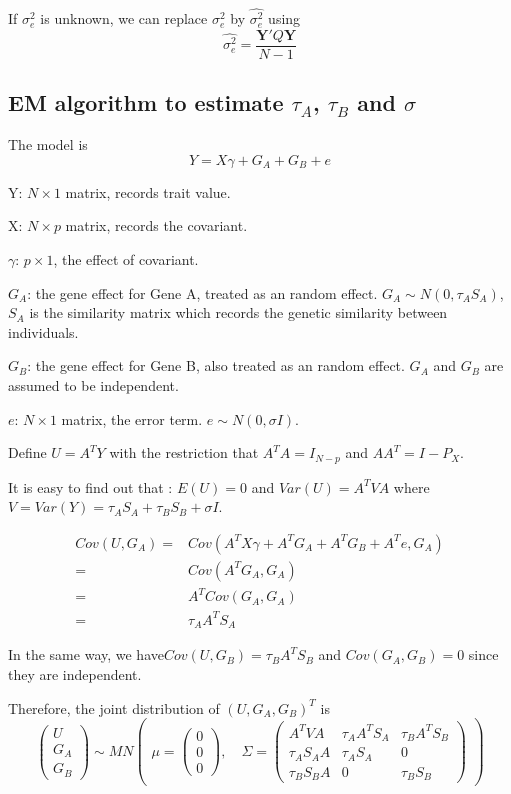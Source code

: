\documentclass{article}
\newcommand{\Y}{\mathbf{Y}}
\begin{document}
            If $\sigma^2_e$ is unknown, we can replace $\sigma^2_e$ by $\hat{\sigma^2_e}$ using
            \[
                \hat{\sigma^2_e}=\frac{\Y'Q\Y}{N-1}
            \]

        \subsection{EM algorithm to estimate $\tau_A$, $\tau_B$ and $\sigma$}
            The model is
    \[
        Y=X\gamma+G_A+G_B+e
    \]

    Y: $N\times1$ matrix, records trait value.

    X: $N\times p$ matrix, records the covariant.

    $\gamma$: $p\times 1$, the effect of covariant.

    $G_A$: the gene effect for Gene A, treated as an random effect. $G_A\sim N(0, \tau_AS_A)$, $S_A$ is the similarity matrix which records the genetic similarity between individuals.

    $G_B$: the gene effect for Gene B, also treated as an random effect. $G_A$ and  $G_B$ are assumed to be independent.

    $e$: $N\times1$ matrix,  the error term. $e\sim N (0, \sigma I)$.

    Define $U=A^TY$ with the restriction that $A^TA=I_{N-p}$ and $AA^T=I-P_X$.

    It is easy to find out that : $E(U)=0$ and $Var(U)=A^TVA$ where $V=Var(Y)=\tau_AS_A+\tau_BS_B+\sigma I$.

    \[ \begin{split}
        Cov(U,G_A)=& Cov(A^TX\gamma+A^TG_A+A^TG_B+A^Te,G_A)\\
                  =& Cov(A^TG_A,G_A)\\
                  =& A^TCov(G_A,G_A)\\
                  =&\tau_AA^TS_A
    \end{split}\]

    In the same way, we have$Cov(U,G_B)=\tau_BA^TS_B$ and $Cov(G_A,G_B)=0$ since they are independent.

    Therefore, the joint distribution of $(U,G_A,G_B)^T$ is
    \[
        \begin{pmatrix} U\\G_A\\G_B \end{pmatrix} \sim MN \begin{pmatrix} \mu=\begin{pmatrix} 0\\0\\0 \end{pmatrix},\quad \Sigma=\begin{pmatrix} A^TVA&\tau_AA^TS_A&\tau_BA^TS_B\\ \tau_AS_AA&\tau_AS_A&0\\\tau_BS_BA&0&\tau_BS_B \end{pmatrix} \end{pmatrix}
    \]
\end{document}
